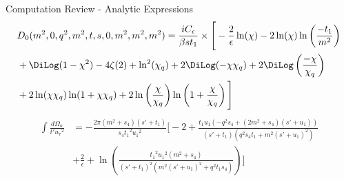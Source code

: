 \begin{frame}[<+->]{Computation Review - Analytic Expressions}
\begin{align*}
\nonumber
&D_0(m^2,0,q^2,m^2,t,s,0,m^2,m^2,m^2) = \frac{i C_\epsilon}{\beta s t_1}\times \Bigg[ -\frac{2}{\epsilon} \ln(\chi) -2\ln(\chi)\ln\left(\frac{-t_1}{m^2}\right)\\
\nonumber
&+\DiLog(1-\chi^2)-4\zeta(2)+\ln^2(\chi_q) + 2\DiLog(-\chi\chi_q)+2\DiLog\left(\frac{-\chi}{\chi_q}\right)\\
&+2\ln(\chi\chi_q) \ln(1+\chi\chi_q)+2\ln\left(\frac{\chi}{\chi_q}\right)\ln\left(1+\frac{\chi}{\chi_q}\right) \Bigg]
\end{align*}
\begin{align*}
\nonumber
\int\!\! \frac{d\Omega_n}{t' {u_7}^2} &= -\frac{2 \pi  (m^2+s_4) ({s'}+{t_1}) }{s_4 {t_1}^2 {u_1}^2} \Bigg[-2+\frac{{t_1} {u_1} (-q^2 s_4+(2 m^2+s_4) ({s'}+{u_1}))}{({s'}+{t_1}) \left(q^2 s_4 {t_1}+m^2 ({s'}+{u_1})^2\right)}\nonumber\\
 & +\frac{2}{\epsilon }+\ln\left(\frac{{t_1}^2 {u_1}^2 ({m^2}+{s_4})}{({s'}+{t_1})^2 \left({m^2} ({s'}+{u_1})^2+{q^2} {t_1} {s_4}\right)}\right)\Bigg]
\end{align*}\pause
{}
\end{frame}
